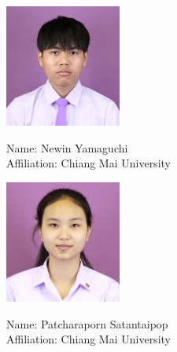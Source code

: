 \documentclass[final,isne,project]{cpecmu}
\author{นายเนวิน ยามากุชิ}{Newin Yamaguchi}{630615028}
\author{นางสาวพัชราภรณ์ สท้านไตรภพ}{Patcharaporn Satantaipop}{630615035}
\begin{document}


\pagestyle{empty}\cleardoublepage
\normalspacing \setcounter{page}{1}  \pagestyle{cpecmu}





\ifproject


\fi

\ifproject

\normalspacing
\appendix


\ifglossary\glossarypage\fi

\ifindex\indexpage\fi

\begin{biosketch}
\begin{figure}[H]
\center
  \begin{minipage}{0.45\textwidth}
    \begin{center}
      \includegraphics[width=1.5in]{./img/newin_photo.jpg}
    \end{center}
    \begin{center}
      \textsf{Name: Newin Yamaguchi} \\
      \textsf{Affiliation: Chiang Mai University} \\
    \end{center}
  \end{minipage}
  \begin{minipage}{0.45\textwidth}
    \begin{center}
      \includegraphics[width=1.5in]{./img/may_photo.jpg}
    \end{center}
    \begin{center}
      \textsf{Name: Patcharaporn Satantaipop} \\
      \textsf{Affiliation: Chiang Mai University} \\
    \end{center}
  \end{minipage}
\end{figure}


\end{biosketch}
\end{document}
